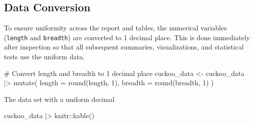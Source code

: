\documentclass[
  letterpaper,
  DIV=11,
  numbers=noendperiod]{scrartcl}
\newenvironment{Shaded}{\begin{snugshade}}{\end{snugshade}}
\newcommand{\AttributeTok}[1]{\textcolor[rgb]{0.40,0.45,0.13}{#1}}
\newcommand{\CommentTok}[1]{\textcolor[rgb]{0.37,0.37,0.37}{#1}}
\newcommand{\DecValTok}[1]{\textcolor[rgb]{0.68,0.00,0.00}{#1}}
\newcommand{\FunctionTok}[1]{\textcolor[rgb]{0.28,0.35,0.67}{#1}}
\newcommand{\NormalTok}[1]{\textcolor[rgb]{0.00,0.23,0.31}{#1}}
\newcommand{\OtherTok}[1]{\textcolor[rgb]{0.00,0.23,0.31}{#1}}
\newcommand{\SpecialCharTok}[1]{\textcolor[rgb]{0.37,0.37,0.37}{#1}}
\begin{document}
\subsection{Data Conversion}\label{data-conversion}

To ensure uniformity across the report and tables, the numerical
variables (\texttt{length} and \texttt{breadth}) are converted to 1
decimal place. This is done immediately after inspection so that all
subsequent summaries, visualizations, and statistical tests use the
uniform data.

\begin{Shaded}
\begin{Highlighting}[]
\CommentTok{\# Convert length and breadth to 1 decimal place}
\NormalTok{cuckoo\_data }\OtherTok{\textless{}{-}}\NormalTok{ cuckoo\_data }\SpecialCharTok{|\textgreater{}}
  \FunctionTok{mutate}\NormalTok{(}
    \AttributeTok{length =} \FunctionTok{round}\NormalTok{(length, }\DecValTok{1}\NormalTok{),}
    \AttributeTok{breadth =} \FunctionTok{round}\NormalTok{(breadth, }\DecValTok{1}\NormalTok{)}
\NormalTok{  )}
\end{Highlighting}
\end{Shaded}

The data set with a uniform decimal

\begin{Shaded}
\begin{Highlighting}[]
\NormalTok{cuckoo\_data }\SpecialCharTok{|\textgreater{}} 
\NormalTok{  knitr}\SpecialCharTok{::}\FunctionTok{kable}\NormalTok{()}
\end{Highlighting}
\end{Shaded}
\end{document}
